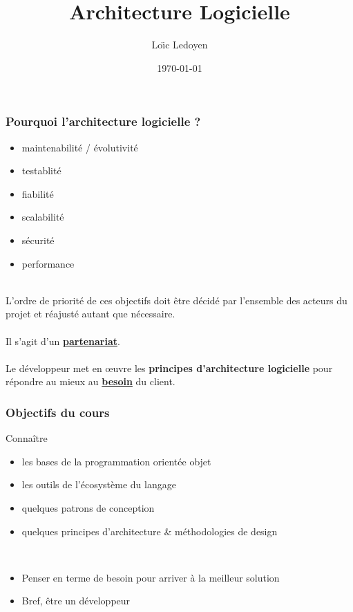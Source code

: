 \documentclass{beamer}
\title[Architecture Logicielle]{Architecture Logicielle}
\author{Lo\"{\i}c Ledoyen}
\institute[LEDOYEN EI] {
    \medskip
    \textit{ledoyen.esiea@gmail.com}
}
\date{\today}
\begin{document}
\begin{frame}
	\titlepage
\end{frame}

\begin{frame}
	\frametitle{Pourquoi l'architecture logicielle ?}
    
    \begin{itemize}
        \item maintenabilit\'{e} / \'{e}volutivit\'{e}
        \item testablit\'{e}
        \item fiabilit\'{e}
        \item scalabilit\'{e}
        \item s\'{e}curit\'{e}
        \item performance
    \end{itemize}
	~\\
    L{'}ordre de priorit\'{e} de ces objectifs doit \^{e}tre d\'{e}cid\'{e} par l{'}ensemble des acteurs du projet et r\'{e}ajust\'{e} autant que n\'{e}cessaire.
    \\~\\
    Il s{'}agit d{'}un \underline{\textbf{partenariat}}.
    \\~\\
    Le d\'{e}veloppeur met en \oe{}uvre les \textbf{principes d'architecture logicielle} pour r\'{e}pondre au mieux au \underline{\textbf{besoin}} du client.
\end{frame}

\begin{frame}
	\frametitle{Objectifs du cours}
    Conna\^{i}tre
	\begin{itemize}
        \item les bases de la programmation orient\'{e}e objet
        \item les outils de l'\'{e}cosyst\`{e}me du langage
        \item quelques patrons de conception
        \item quelques principes d'architecture \& m\'{e}thodologies de design
    \end{itemize}
    ~\\
    \begin{itemize}
    	\item Penser en terme de besoin pour arriver \`{a} la meilleur solution
        \item Bref, \^{e}tre un d\'{e}veloppeur
    \end{itemize}
\end{frame}
\end{document}
